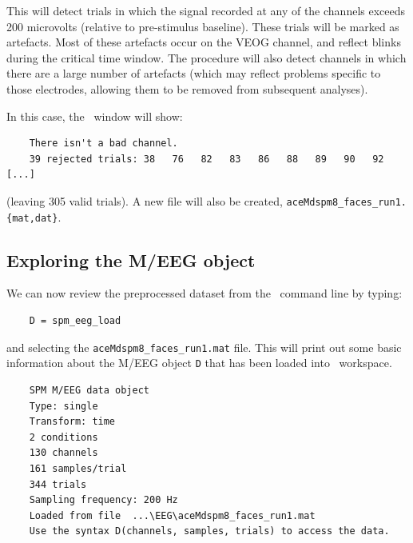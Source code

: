 This will detect trials in which the signal recorded at any of the channels exceeds 200 microvolts (relative to pre-stimulus baseline). These trials will be marked as artefacts. Most of these artefacts occur on the VEOG channel, and reflect blinks during the critical time window. The procedure will also detect channels in which there are a large number of artefacts (which may reflect problems specific to those electrodes, allowing them to be removed from subsequent analyses).

In this case, the \matlab\ window will show:
\begin{verbatim}
    There isn't a bad channel.
    39 rejected trials: 38   76   82   83   86   88   89   90   92   [...]
\end{verbatim}
(leaving 305 valid trials). A new file will also be created, \texttt{aceMdspm8\_faces\_run1.\{mat,dat\}}.

\subsection{Exploring the M/EEG object}

We can now review the preprocessed dataset from the \matlab\ command line by typing:
\begin{verbatim}
    D = spm_eeg_load
\end{verbatim}
and selecting the \texttt{aceMdspm8\_faces\_run1.mat} file. This will print out some basic information about the M/EEG object \texttt{D} that has been loaded into \matlab\ workspace.
\begin{verbatim}
    SPM M/EEG data object
    Type: single
    Transform: time
    2 conditions
    130 channels
    161 samples/trial
    344 trials
    Sampling frequency: 200 Hz
    Loaded from file  ...\EEG\aceMdspm8_faces_run1.mat
    Use the syntax D(channels, samples, trials) to access the data.
\end{verbatim}

